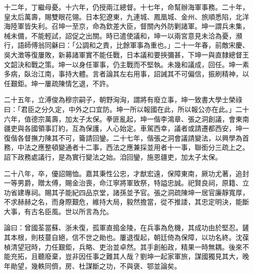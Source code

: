 \begin{pinyinscope}
十二年，丁繼母憂。十六年，仍授兩江總督。十七年，命幫辦海軍事務。二十年，皇太后萬壽，賜雙眼花翎。日本犯遼東，九連城、鳳凰城、金州、旅順悉陷，北洋海陸軍皆失利。召坤一至京，命為欽差大臣，督關內外防剿諸軍。坤一謂兵未集，械未備，不能輕試，詔促之出關。時已遣使議和，坤一以兩宮意見未洽為憂，瀕行，語師傅翁同龢曰：「公調和之責，比餘軍事為重也。」二十一年春，前敵宋慶、吳大澂等復屢敗，新募諸軍實不能任戰，日本議和要挾彌甚，下坤一與直隸總督王文韶決和戰之策。坤一以身任軍事，仍主戰而不堅執。未幾和議成，回任。坤一素多病，臥治江南，事持大體。言者論其左右用事，詔誡其不可偏信，振刷精神，以任艱鉅。坤一屢疏陳情乞退，不許。

二十五年，立溥俊為穆宗嗣子，朝野洶洶，謂將有廢立事，坤一致書大學士榮祿曰：「君臣之分久定，中外之口宜防。坤一所以報國在此，所以報公亦在此。」二十六年，值德宗萬壽，加太子太保。拳匪亂起，坤一偕李鴻章、張之洞創議，會東南疆吏與各國領事訂約，互為保護，人心始定。車駕西幸，議者或請遷都西安，坤一復偕各督撫力陳其不可，籥請回鑾。二十七年，偕張之洞會議請變法，以興學為首務，中法之應整頓變通者十二事，西法之應兼採並用者十一事，聯銜分三疏上之。詔下政務處議行，是為實行變法之始。洎回鑾，施恩疆吏，加太子太保。

二十八年，卒，優詔賜恤。嘉其秉性公忠，才猷宏遠，保障東南，厥功尤著，追封一等男爵，贈太傅，賜金治喪，命江寧將軍致祭，特謚忠誠。祀賢良祠，原籍、立功省建專祠。賜其子能紀四品京堂，諸孫並予官。張之洞疏陳坤一居官廉靜寬厚，不求赫赫之名，而身際艱危，維持大局，毅然擔當，從不推諉，其忠定明決，能斷大事，有古名臣風。世以所言為允。

論曰：曾國荃當蘇、浙未復，孤軍直搗金陵，在兵事為危機，其成功由於堅忍。鏟其本根，則枝蔓自絕，信不世之勛也。屢退復起，朝廷倚為保障，以功名終。沈葆楨清望冠時，力任艱鉅，兵略、吏治並卓然。其手創船政，精果一時無耦。後來不能充拓，且聽廢棄，豈非因任事之難其人哉？劉坤一起家軍旅，謀國獨見其大，晚年勛望，幾軼同儕，房、杜謀斷之功，不與褒、鄂並論矣。


\end{pinyinscope}